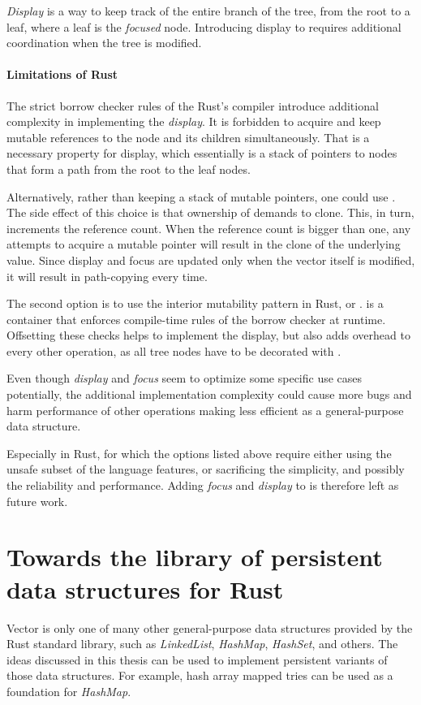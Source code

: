 \emph{Display} is a way to keep track of the entire branch of the tree, from the root to a leaf, where a leaf is the \emph{focused} node. Introducing display to \rrbtree{} requires additional coordination when the tree is modified. 

\paragraph{Limitations of Rust}
The strict borrow checker rules of the Rust's compiler introduce additional complexity in implementing the \emph{display}. It is forbidden to acquire and keep mutable references to the node and its children simultaneously. That is a necessary property for display, which essentially is a stack of pointers to nodes that form a path from the root to the leaf nodes. 

Alternatively, rather than keeping a stack of mutable pointers, one could use \rc{}. The side effect of this choice is that ownership of \rc{} demands to clone. This, in turn, increments the reference count. When the reference count is bigger than one, any attempts to acquire a mutable pointer will result in the clone of the underlying value. Since display and focus are updated only when the vector itself is modified, it will result in path-copying every time.

The second option is to use the interior mutability pattern in Rust, or .  is a container that enforces compile-time rules of the borrow checker at runtime. Offsetting these checks helps to implement the display, but also adds overhead to every other operation, as all tree nodes have to be decorated with .  

Even though \emph{display} and \emph{focus} seem to optimize some specific use cases potentially, the additional implementation complexity could cause more bugs and harm performance of other operations making \rrbtree{} less efficient as a general-purpose data structure. 

Especially in Rust, for which the options listed above require either using the unsafe subset of the language features, or sacrificing the simplicity, and possibly the reliability and performance. Adding \emph{focus} and \emph{display} to \rrbvec{} is therefore left as future work.

\section{Towards the library of persistent data structures for Rust}
Vector is only one of many other general-purpose data structures provided by the Rust standard library, such as \emph{LinkedList}, \emph{HashMap}, \emph{HashSet}, and others. The ideas discussed in this thesis can be used to implement persistent variants of those data structures. For example, hash array mapped tries\cite{ideal-hash-trees} can be used as a foundation for \emph{HashMap}. 

